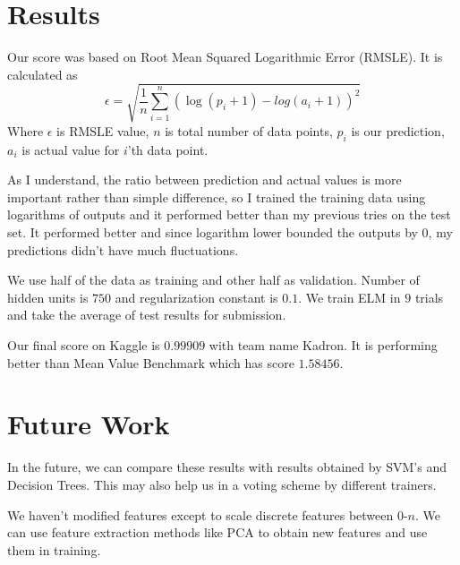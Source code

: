 \documentclass[11pt]{article} %
\begin{document}
\section{Results}
Our score was based on Root Mean Squared Logarithmic Error (RMSLE). It is calculated as
\[
\epsilon = \sqrt{\frac{1}{n}\sum_{i=1}^{n}(\log(p_{i}+1) - log(a_{i}+1))^2}
\]
Where $\epsilon$ is RMSLE value, $n$ is total number of data points, $p_{i}$ is our prediction, $a_{i}$ is actual value for $i$'th data point.

As I understand, the ratio between prediction and actual values is more important rather than simple difference, so I trained the training data using logarithms of outputs and it performed better than my previous tries on the test set. It performed better and since logarithm lower bounded the outputs by 0, my predictions didn't have much fluctuations. 

We use half of the data as training and other half as validation. Number of hidden units is $750$ and regularization constant is $0.1$. We train ELM in $9$ trials and take the average of test results for submission.

Our final score on Kaggle is $0.99909$ with team name Kadron. It is performing better than Mean Value Benchmark which has score $1.58456$.

\section{Future Work}
In the future, we can compare these results with results obtained by SVM's and Decision Trees. This may also help us in a voting scheme by different trainers.

We haven't modified features except to scale discrete features between 0-$n$. We can use feature extraction methods like PCA to obtain new features and use them in training.



\end{document}
